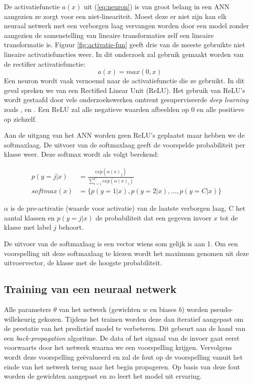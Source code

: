 \npar De activatiefunctie $a(x)$ uit (\ref{eq:neuron}) is van groot belang in een ANN aangezien ze zorgt voor een niet-lineariteit. Moest deze er niet zijn kan elk neuraal netwerk met een verborgen laag vervangen worden door een model zonder aangezien de samenstelling van lineaire transformaties zelf een lineaire transformatie is. Figuur \ref{fig:activatie-fun} geeft drie van de meeste gebruikte niet lineaire activatiefuncties weer. In dit onderzoek zal gebruik gemaakt worden van de rectifier activatiefunctie:
\begin{equation}
\quad a(x) = max(0,x)
\end{equation}
Een neuron wordt vaak vernoemd naar de activatiefunctie die ze gebruikt. In dit geval spreken we van een Rectified Linear Unit (ReLU). Het gebruik van ReLU's wordt gestaafd door vele onderzoekswerken omtrent gesuperviseerde \textit{deep learning} zoals \cite{ReLU}, \cite{lionel} en \cite{wu_deep_2016}. Een ReLU zal alle negatieve waarden afbeelden op 0 en alle positieve op zichzelf.

\npar Aan de uitgang van het ANN worden geen ReLU's geplaatst maar hebben we de softmaxlaag. De uitvoer van de softmaxlaag geeft de voorspelde probabiliteit per klasse weer. Deze softmax wordt als volgt berekend:

\begin{equation}
\begin{aligned}
p(y = j | x) &= \frac{exp(\alpha(x)_j)}{\sum_{i=1}^{C}exp(\alpha(x)_i)}\\
softmax(x) &= \{p(y = 1 | x), p(y = 2 | x), ... , p(y = C | x)\}
\end{aligned}
\end{equation}

\npar $\alpha$ is de pre-activatie (waarde voor activatie) van de laatste verborgen laag, C het aantal klassen en $p(y=j|x)$ de probabiliteit dat een gegeven invoer $x$ tot de klasse met label $j$ behoort.

\npar De uitvoer van de softmaxlaag is een vector wiens som gelijk is aan 1. Om een voorspelling uit deze softmaxlaag te kiezen wordt het maximum genomen uit deze uitvoervector, de klasse met de hoogste probabiliteit. 

\subsection{Training van een neuraal netwerk}\label{sec:leren}
Alle parameters $\theta$ van het netwerk (gewichten $w$ en biases $b$) worden pseudo-willekeurig gekozen. Tijdens het trainen worden deze dan iteratief aangepast om de prestatie van het predictief model te verbeteren. Dit gebeurt aan de hand van een \textit{back-propagation} algoritme. De data of het signaal van de invoer gaat eerst voorwaarts door het netwerk waarna we een voorspelling krijgen. Vervolgens wordt deze voorspelling ge\"evalueerd en zal de fout op de voorspelling vanuit het einde van het netwerk terug naar het begin propageren. Op basis van deze fout worden de gewichten aangepast en zo leert het model uit ervaring.

